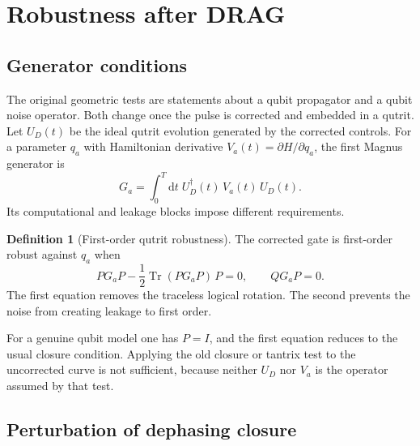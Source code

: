 \documentclass[11pt,a4paper]{article}
\theoremstyle{definition}
\newtheorem{definition}{Definition}
\newcommand{\Tr}{\operatorname{Tr}}
\newcommand{\dd}{\mathrm{d}}
\begin{document}
\section{Robustness after DRAG}
\label{sec:robust}

\subsection{Generator conditions}

The original geometric tests are statements about a qubit propagator and a
qubit noise operator.  Both change once the pulse is corrected and embedded in
a qutrit.  Let \(U_D(t)\) be the ideal qutrit evolution generated by the
corrected controls.  For a parameter \(q_a\) with Hamiltonian derivative
\(V_a(t)=\partial H/\partial q_a\), the first Magnus generator is
\begin{equation}
\label{eq:generator}
  G_a=\int_0^T\dd t\; U_D^\dagger(t)\,V_a(t)\,U_D(t).
\end{equation}
Its computational and leakage blocks impose different requirements.

\begin{definition}[First-order qutrit robustness]
The corrected gate is first-order robust against \(q_a\) when
\begin{equation}
\label{eq:robust-blocks}
  PG_aP-\frac12\Tr(PG_aP)\,P=0,
  \qquad QG_aP=0.
\end{equation}
The first equation removes the traceless logical rotation.  The second
prevents the noise from creating leakage to first order.
\end{definition}

For a genuine qubit model one has \(P=I\), and the first equation reduces to
the usual closure condition.  Applying the old closure or tantrix test to the
uncorrected curve is not sufficient, because neither \(U_D\) nor \(V_a\) is the
operator assumed by that test.

\subsection{Perturbation of dephasing closure}
\end{document}
